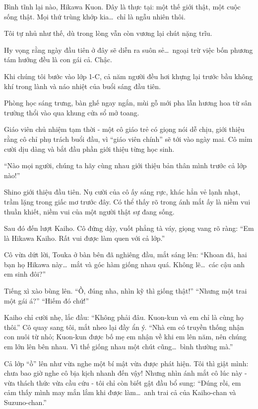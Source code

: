 \documentclass[../main.tex]{subfiles}
\begin{document}
Bình tĩnh lại nào, Hikawa Kuon. Đây là thực tại: một thế giới thật, một cuộc sống thật. Mọi thứ trùng khớp kia\dots\ chỉ là ngẫu nhiên thôi.

Tôi tự nhủ như thế, dù trong lòng vẫn còn vương lại chút nặng trĩu.

Hy vọng rằng ngày đầu tiên ở đây sẽ diễn ra suôn sẻ\dots\ ngoại trừ việc bốn phương tám hướng đều là con gái cả. Chậc.

\ct

Khi chúng tôi bước vào lớp 1-C, cả năm người đều hơi khựng lại trước bầu không khí trong lành và náo nhiệt của buổi sáng đầu tiên.

Phòng học sáng trưng, bàn ghế ngay ngắn, mùi gỗ mới pha lẫn hương hoa từ sân trường thổi vào qua khung cửa sổ mở toang.

Giáo viên chủ nhiệm tạm thời - một cô giáo trẻ có giọng nói dễ chịu, giới thiệu rằng cô chỉ phụ trách buổi đầu, vì ``giáo viên chính'' sẽ tới vào ngày mai. Cô mỉm cười dịu dàng và bắt đầu phần giới thiệu từng học sinh.

``Nào mọi người, chúng ta hãy cùng nhau giới thiệu bản thân mình trước cả lớp nào!''

Shino giới thiệu đầu tiên. Nụ cười của cô ấy sáng rực, khác hẳn vẻ lạnh nhạt, trầm lặng trong giấc mơ trước đây. Có thể thấy rõ trong ánh mắt ấy là niềm vui thuần khiết, niềm vui của một người thật sự đang sống.

Sau đó đến lượt Kaiho. Cô đứng dậy, vuốt phẳng tà váy, giọng vang rõ ràng: ``Em là Hikawa Kaiho. Rất vui được làm quen với cả lớp.''

Cô vừa dứt lời, Touka ở bàn bên đã nghiêng đầu, mắt sáng lên: ``Khoan đã, hai bạn họ Hikawa này\dots\ mắt và góc hàm giống nhau quá. Không lẽ\dots\ các cậu anh em sinh đôi?''

Tiếng xì xào bùng lên. ``Ồ, đúng nha, nhìn kỹ thì giống thật!'' ``Nhưng một trai một gái á?'' ``Hiếm đó chứ!''

Kaiho chỉ cười nhẹ, lắc đầu: ``Không phải đâu. Kuon-kun và em chỉ là cùng họ thôi.'' Cô quay sang tôi, mắt nheo lại đầy ẩn ý. ``Nhà em có truyền thống nhận con nuôi từ nhỏ; Kuon-kun được bố mẹ em nhận về khi em lên năm, nên chúng em lớn lên bên nhau. Vì thế giống nhau một chút cũng\dots\ bình thường mà.''

Cả lớp ``ồ'' lên như vừa nghe một bí mật vừa được phát hiện. Tôi thì giật mình: chưa bao giờ nghe cô bịa kịch nhanh đến vậy! Nhưng nhìn ánh mắt cô lúc này - vừa thách thức vừa cầu cứu - tôi chỉ còn biết gật đầu bổ sung: ``Đúng rồi, em cảm thấy mình may mắn lắm khi được làm\dots\ anh trai cả của Kaiho-chan và Suzuno-chan.''
\end{document}
